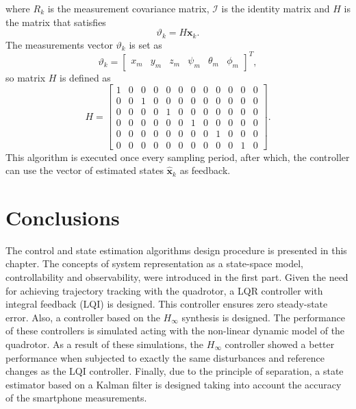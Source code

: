 where $R_k$ is the measurement covariance matrix, $\mathcal{I}$ is the identity matrix and $H$ is the matrix that satisfies
\begin{equation}
\vartheta_k = H \mathbf{x}_k.
\end{equation}
The measurements vector $\vartheta_k$ is set as
\begin{equation}
\vartheta_k = \begin{bmatrix}
x_{m} & y_{m} & z_{m} & \psi_{m} & \theta_{m} & \phi_{m}
\end{bmatrix}^{T},
\end{equation}
so matrix $H$ is defined as
\begin{equation}\label{eqn:H}
H =\begin{bmatrix}
1 & 0 & 0 & 0 & 0 & 0 & 0 & 0 & 0 & 0 & 0 & 0\\
0 & 0 & 1 & 0 & 0 & 0 & 0 & 0 & 0 & 0 & 0 & 0\\
0 & 0 & 0 & 0 & 1 & 0 & 0 & 0 & 0 & 0 & 0 & 0\\
0 & 0 & 0 & 0 & 0 & 0 & 1 & 0 & 0 & 0 & 0 & 0\\
0 & 0 & 0 & 0 & 0 & 0 & 0 & 0 & 1 & 0 & 0 & 0\\
0 & 0 & 0 & 0 & 0 & 0 & 0 & 0 & 0 & 0 & 1 & 0
			\end{bmatrix}.
\end{equation}
This algorithm is executed once every sampling period, after which, the controller can use the vector of estimated states $\hat{\mathbf{x}}_{k}$ as feedback.



\section{Conclusions}
The control and state estimation algorithms design procedure is presented in this chapter. The concepts of system representation as a state-space model, controllability and observability, were introduced in the first part. Given the need for achieving trajectory tracking with the quadrotor, a LQR controller with integral feedback (LQI) is designed. This controller ensures zero steady-state error. Also, a controller based on the $H_\infty$ synthesis is designed. The performance of these controllers is simulated acting with the non-linear dynamic model of the quadrotor. As a result of these simulations, the $H_\infty$ controller showed a better performance when subjected to exactly the same disturbances and reference changes as the LQI controller.
Finally, due to the principle of separation, a state estimator based on a Kalman filter is designed taking into account the accuracy of the smartphone measurements.